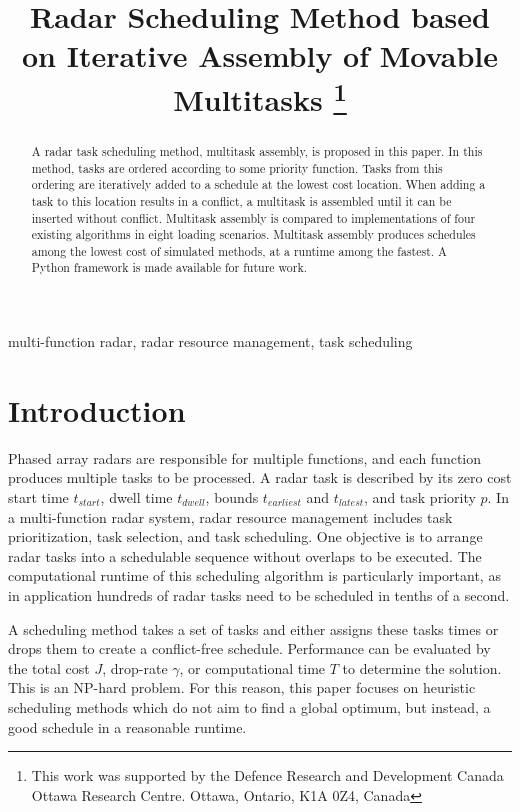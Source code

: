 \documentclass[conference]{IEEEtran}
\begin{document}
\title{Radar Scheduling Method based on Iterative Assembly of Movable Multitasks
	\thanks{This work was supported by the Defence Research and Development Canada Ottawa Research Centre. Ottawa, Ontario, K1A 0Z4, Canada}
}

\author{
}

\maketitle

\begin{abstract}
	A radar task scheduling method, multitask assembly, is proposed in this paper.
	In this method, tasks are ordered according to some priority function.
	Tasks from this ordering are iteratively added to a schedule at the lowest cost location.
	When adding a task to this location results in a conflict, a multitask is assembled until it can be inserted without conflict.
	Multitask assembly is compared to implementations of four existing algorithms in eight loading scenarios.
	Multitask assembly produces schedules among the lowest cost of simulated methods, at a runtime among the fastest.
	A Python framework is made available for future work.
\end{abstract}

\begin{IEEEkeywords}
	multi-function radar, radar resource management, task scheduling
\end{IEEEkeywords}

\section{Introduction}

Phased array radars are responsible for multiple functions, and each function produces multiple tasks to be processed.
A radar task is described by its zero cost start time $t_{start}$, dwell time $t_{dwell}$, bounds $t_{earliest}$ and $t_{latest}$, and task priority $p$.
In a multi-function radar system, radar resource management includes task prioritization, task selection, and task scheduling.
One objective is to arrange radar tasks into a schedulable sequence without overlaps to be executed.
The computational runtime of this scheduling algorithm is particularly important, as in application hundreds of radar tasks need to be scheduled in tenths of a second.

A scheduling method takes a set of tasks and either assigns these tasks times or drops them to create a conflict-free schedule.
Performance can be evaluated by the total cost $J$, drop-rate $\gamma$, or computational time $T$ to determine the solution.
This is an NP-hard problem.
For this reason, this paper focuses on heuristic scheduling methods which do not aim to find a global optimum, but instead, a good schedule in a reasonable runtime.
\end{document}
